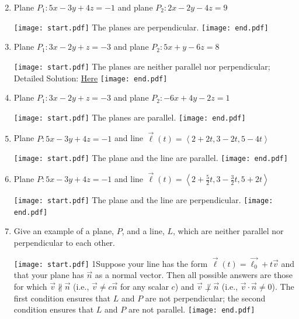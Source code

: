 \documentclass[12pt]{article}
\begin{document}

\begin{enumerate}
\setcounter{enumi}{1}

\item Plane $P_1:5x-3y+4z=-1$ and plane $P_2: 2x-2y-4z=9$

\texttt{[image: start.pdf]}
{{The planes are perpendicular.}}
\texttt{[image: end.pdf]}


\item Plane $P_1: 3x-2y+z=-3$ and plane $P_2: 5x+y-6z=8$

\texttt{[image: start.pdf]}
{{The planes are neither parallel nor perpendicular; Detailed Solution: \textcolor{blue}{\href{http://www.math.drexel.edu/classes/Calculus/resources/Math200HW/Solutions/06_200_Planes_03.pdf}{Here}}}}
\texttt{[image: end.pdf]}


\item Plane $P_1: 3x-2y+z=-3$ and plane $P_2: -6x+4y-2z=1$

\texttt{[image: start.pdf]}
{{The planes are parallel.}}
\texttt{[image: end.pdf]}


\item Plane $P:5x-3y+4z=-1$ and line $\overrightarrow{\ell}(t)=\left\langle2+2t, 3-2t, 5-4t\right\rangle$

\texttt{[image: start.pdf]}
{{The plane and the line are parallel.}}
\texttt{[image: end.pdf]}


\item Plane $P:5x-3y+4z=-1$ and line $\overrightarrow{\ell}(t)=\left\langle2+\frac{5}{2}t, 3-\frac{3}{2}t, 5+2t\right\rangle$

\texttt{[image: start.pdf]}
{{The plane and the line are perpendicular.}}
\texttt{[image: end.pdf]}


\item Give an example of a plane, $P$, and a line, $L$, which are neither parallel nor perpendicular to each other.

\texttt{[image: start.pdf]}
{{{1\linewidth}{Suppose your line has the form $\overrightarrow{\ell}(t)=\overrightarrow{\ell_0}+t\overrightarrow{v}$ and that your plane has $\overrightarrow{n}$ as a normal vector.  Then all possible answers are those for which $\overrightarrow{v} \not\parallel \overrightarrow{n}$ (i.e., $\overrightarrow{v}\neq c\overrightarrow{n}$ for any scalar $c$) and $\overrightarrow{v} \not\perp \overrightarrow{n}$ (i.e., $\overrightarrow{v}\cdot\overrightarrow{n}\neq 0$).  The first condition ensures that $L$ and $P$ are not perpendicular; the second condition ensures that $L$ and $P$ are not parallel.}}}
\texttt{[image: end.pdf]}


\end{enumerate}
\end{document}

